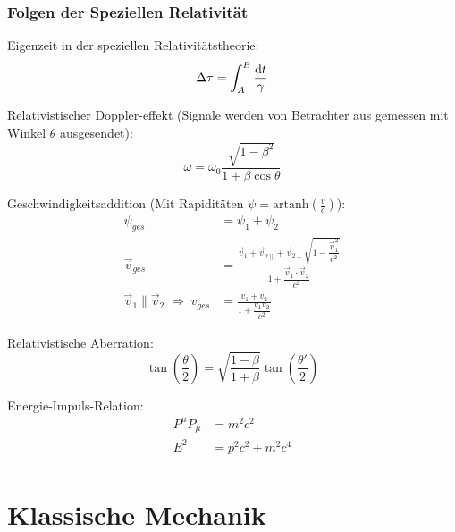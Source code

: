 \documentclass[11pt]{article}
\numberwithin{equation}{section}
\begin{document}
			\subsubsection{Folgen der Speziellen Relativität}
				\noindent
				Eigenzeit in der speziellen Relativitätstheorie:
				\begin{equation}
					\Delta\tau = \int_A^B \frac{\mathrm{d} t}{\gamma}
				\end{equation}

				\noindent
				Relativistischer Doppler-effekt (Signale werden von Betrachter aus gemessen mit Winkel $\theta$ ausgesendet):
				\begin{equation}
					\omega = \omega_0\frac{\sqrt{1-\beta^2}}{1+\beta\cos\theta}
				\end{equation}

				\noindent
				Geschwindigkeitsaddition (Mit Rapiditäten $\psi = \mathrm{artanh}\left(\frac{v}{c}\right)$):
				\begin{equation}
					\begin{aligned}
						\psi_{ges} &= \psi_1+\psi_2 \\
						\vec{v}_{ges} &= \frac{\vec{v}_1+\vec{v}_{2\parallel}+\vec{v}_{2\perp}\sqrt{1-\dfrac{\vec{v}_1^2}{c^2}}}{1+\dfrac{\vec{v}_1\cdot\vec{v}_2}{c^2}} \\
						\vec{v}_1\parallel\vec{v}_2 \;\Rightarrow\; v_{ges} &= \frac{v_1+v_2}{1+\dfrac{v_1 v_2}{c^2}}
					\end{aligned}
				\end{equation}

				\noindent
				Relativistische Aberration:
				\begin{equation}
					\tan\left(\frac{\theta}{2}\right) = \sqrt{\frac{1-\beta}{1+\beta}}\tan\left(\frac{\theta'}{2}\right)
				\end{equation}

				\noindent
				Energie-Impuls-Relation:
				\begin{equation}
					\begin{aligned}
						P^\mu P_\mu &= m^2 c^2\\
						E^2 &= p^2 c^2 + m^2 c^4 \\
					\end{aligned}
				\end{equation}
				\newpage

	\section{Klassische Mechanik}
\end{document}
